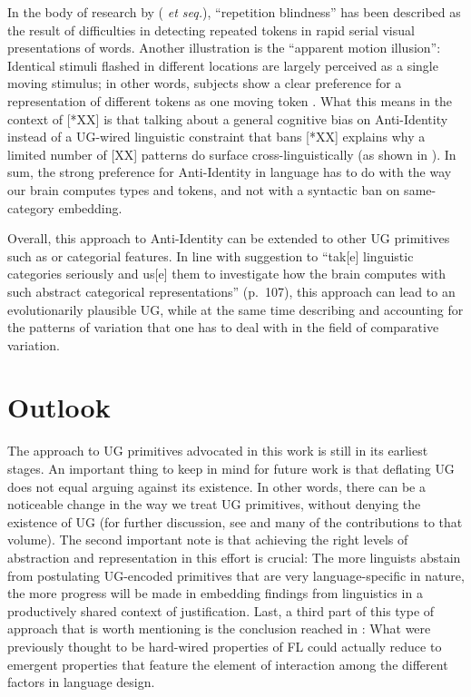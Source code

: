\documentclass[output=paper]{langsci/langscibook}
\begin{document}
In the body of research by \citeauthor{Kanwisher1987} (\citeyear{Kanwisher1987}
\emph{et seq.}), \enquote{repetition blindness} has been described as the
result of difficulties in detecting repeated tokens in rapid serial visual
presentations of words.  Another illustration is the \enquote{apparent motion
illusion}: Identical stimuli flashed in different locations are largely
perceived as a single moving stimulus; in other words, subjects show a clear
preference for a representation of different tokens as one moving token
\citep{VetterEtAl2012}. What this means in the context of [*XX] is that talking
about a general cognitive bias on Anti-Identity instead of a UG-wired
linguistic constraint that bans [*XX] explains why a limited number of [XX]
patterns do surface cross-linguistically (as shown in \citealt{Leivada2015b}).
In sum, the strong preference for Anti-Identity in language has to do with the
way our brain computes types and tokens, and not with a syntactic ban on
same-category embedding.

Overall, this approach to Anti-Identity can be extended to other \gls{UG}
primitives such as  or categorial features. In line with
 suggestion to \enquote{tak[e] linguistic categories
    seriously and us[e] them to investigate how the brain computes with such
abstract categorical representations} (p.\ 107), this approach can lead to an
evolutionarily plausible \gls{UG}, while at the same time describing and
accounting for the patterns of variation that one has to deal with in the field
of comparative variation.

\section{Outlook}\label{sec:key:4}

The approach to \gls{UG} primitives advocated in this work is still in its
earliest stages. An important thing to keep in mind for future work is that
deflating \gls{UG} does not equal arguing against its existence. In other
words, there can be a noticeable change in the way we treat \gls{UG}
primitives, without denying the existence of \gls{UG} (for further discussion,
see \citealt{Roberts2016b} and many of the contributions to that volume). The
second important note is that achieving the right levels of abstraction and
representation in this effort is crucial: The more linguists abstain from
postulating UG-encoded primitives that are very language-specific in nature,
the more progress will be made in embedding findings from linguistics in a
productively shared context of justification. Last, a third part of this type
of approach that is worth mentioning is the conclusion reached in
\citet{BibRobShee2014}: What were previously thought to be hard-wired
properties of \gls{FL} could actually reduce to emergent properties that
feature the element of interaction among the different factors in language
design.
\end{document}

